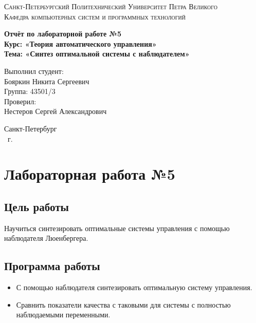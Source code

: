 \documentclass[14pt,a4paper,report]{report}
\begin{document}
\def\contentsname{Содержание}

\begin{titlepage}
	\begin{center}
		\textsc{Санкт-Петербургский Политехнический 
			Университет Петра Великого\\[5mm]
			Кафедра компьютерных систем и программных технологий}
		
		\vfill
		
		\textbf{Отчёт по лабораторной работе №5\\[3mm]
			Курс: «Теория автоматического управления»\\[3mm]
			Тема: «Синтез оптимальной системы с наблюдателем»\\[35mm]
			}
	\end{center}
	
	\hfill
	\begin{minipage}{.5\textwidth}
		Выполнил студент:\\[2mm] 
		Бояркин Никита Сергеевич\\
		Группа: 43501/3\\[5mm]
		
		Проверил:\\[2mm] 
		Нестеров Сергей Александрович
	\end{minipage}
	\vfill
	\begin{center}
		Санкт-Петербург\\ \the\year\ г.
	\end{center}
\end{titlepage}

\tableofcontents
\clearpage

\chapter{Лабораторная работа №5}

\section{Цель работы}

Научиться синтезировать оптимальные системы управления с помощью наблюдателя Люенбергера.

\section{Программа работы}

\begin{itemize}
	\item С помощью наблюдателя  синтезировать оптимальную систему управления.
	\item Сравнить показатели качества с таковыми для системы с полностью наблюдаемыми переменными.
\end{itemize}
\end{document}
